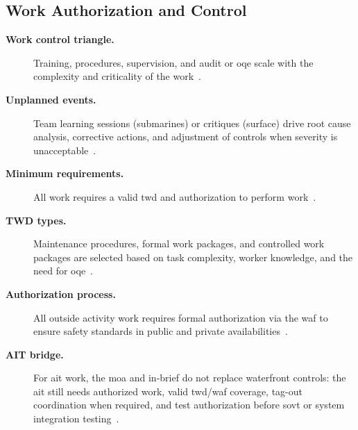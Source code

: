 \documentclass[../main.tex]{subfiles}
\begin{document}
\subsection{Work Authorization and Control}
\begin{description}
  \item[\textbf{Work control triangle.}] Training, procedures, supervision, and audit or \ac{oqe} scale with the complexity and criticality of the work~\autocite{edo-4-1-5-waterfront-work-control-2025}.
  \item[\textbf{Unplanned events.}] Team learning sessions (submarines) or critiques (surface) drive root cause analysis, corrective actions, and adjustment of controls when severity is unacceptable~\autocite{edo-4-1-5-waterfront-work-control-2025}.
  \item[\textbf{Minimum requirements.}] All work requires a valid \ac{twd} and authorization to perform work~\autocite{edo-4-1-5-waterfront-work-control-2025}.
  \item[\textbf{TWD types.}] Maintenance procedures, formal work packages, and controlled work packages are selected based on task complexity, worker knowledge, and the need for \ac{oqe}~\autocite{edo-4-1-5-waterfront-work-control-2025}.
  \item[\textbf{Authorization process.}] All outside activity work requires formal authorization via the \ac{waf} to ensure safety standards in public and private availabilities~\autocite{edo-4-1-5-waterfront-work-control-2025}.
  \item[\textbf{AIT bridge.}] For \ac{ait} work, the \ac{moa} and in-brief do not replace waterfront controls: the
        \ac{ait} still needs authorized work, valid \ac{twd}/\ac{waf} coverage, tag-out coordination when required, and
        test authorization before \ac{sovt} or system integration testing~\autocite{edo-4-1-4-ait-fundamentals-2025,edo-4-1-5-waterfront-work-control-2025,TS9090-310}.
\end{description}
\end{document}
